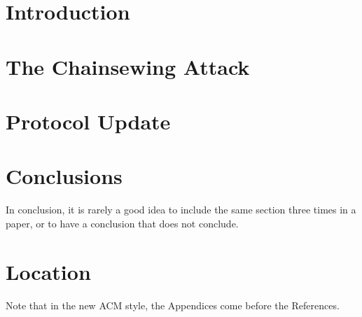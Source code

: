 \section{Introduction}
\cite{Backbone}\cite{nakamoto}\cite{NIPoPoWs}\cite{Zamyatin}\cite{selfish_mining}

\section{The Chainsewing Attack}


\section{Protocol Update}


%

\section{Conclusions}

In conclusion, it is rarely a good idea to include the same section three times in a paper, or to have a conclusion that does not conclude.

\appendix

\section{Location}

Note that in the new ACM style, the Appendices come before the References.

\begin{acks}
\end{acks}
